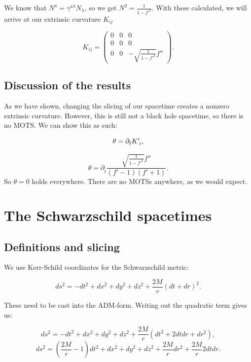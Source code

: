 \documentclass[twoside, openright]{RadboudReport}
\begin{document}
We know that $N^a = \gamma^{a\lambda}N_\lambda$, so we get $N^2 = \frac{1}{1-f'^2}$. With these calculated, we will arrive at our extrinsic curvature $K_{ij}$

\begin{equation}
	K_{ij} =
	\begin{pmatrix}
		0& 0 & 0 \\
		0 & 0 & 0 \\
		0 & 0 & -\sqrt{\frac{1}{1-f'^2}}f'' 
	\end{pmatrix}.
\end{equation}

\newpage

\subsection{Discussion of the results}

As we have shown, changing the slicing of our spacetime creates a nonzero extrinsic curvature. However, this is still not a black hole spacetime, so there is no MOTS. We can show this as such:

\begin{equation*}
	\theta = \partial_{\tilde{t}} K^i_{\hphantom{i}i},
\end{equation*} 

\begin{equation*}
	\theta = \partial_{\tilde{t}}\frac{\sqrt{\frac{1}{1-f'^2}}f''}{(f'-1)(f'+1)}.
\end{equation*}
So $\theta = 0$ holds everywhere. There are no MOTSs anywhere, as we would expect.
\section{The Schwarzschild spacetimes}
\subsection{Definitions and slicing}

We use Kerr-Schild coordinates for the Schwarzschild metric:

\begin{equation}
    ds^2 = -dt^2 + dx^2+dy^2+dz^2+\frac{2M}{r}(dt+dr)^2.
\end{equation}

These need to be cast into the ADM-form. Writing out the quadratic term gives us:

\begin{equation}
    ds^2 = -dt^2 + dx^2+dy^2+dz^2+\frac{2M}{r}(dt^2+2dtdr+dr^2),
\end{equation}
\begin{equation}
    ds^2 = \left(\frac{2M}{r}-1\right)dt^2 + dx^2+dy^2+dz^2+\frac{2M}{r}dr^2 + \frac{2M}{r}2dtdr.
\end{equation}
\end{document}
